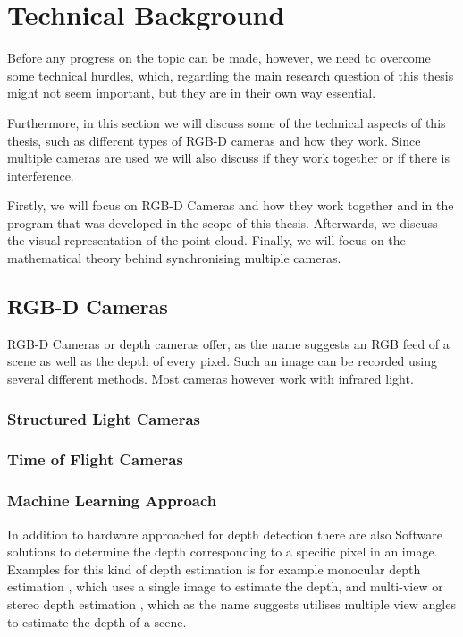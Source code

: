 \section{Technical Background}

Before any progress on the topic can be made, however, we need to overcome some technical hurdles, which, regarding the main research question of this thesis might not seem important, but they are in their own way essential.

Furthermore, in this section we will discuss some of the technical aspects of this thesis, such as different types of RGB-D cameras and how they work. Since multiple cameras are used we will also discuss if they work together or if there is interference.

Firstly, we will focus on RGB-D Cameras and how they work together and in the program that was developed in the scope of this thesis. Afterwards, we discuss the visual representation of the point-cloud. Finally, we will focus on the mathematical theory behind synchronising multiple cameras. 

\subsection{RGB-D Cameras}

RGB-D Cameras or depth cameras offer, as the name suggests an RGB feed of a scene as well as the depth of every pixel. Such an image can be recorded using several different methods. Most cameras however work with infrared light.

\subsubsection{Structured Light Cameras}

\subsubsection{Time of Flight Cameras}

\subsubsection{Machine Learning Approach}

In addition to hardware approached for depth detection there are also Software solutions to determine the depth corresponding to a specific pixel in an image. Examples for this kind of depth estimation is for example monocular depth estimation \cite{mono_depthestimation_bts, mono_depthestimation_depthformer, mono_depthestimation_glpn}, which uses a single image to estimate the depth, and multi-view or stereo depth estimation \cite{multiview_depthestimation_epipolar, multiview_depthestimation_fusion, multiview_depthestimation_RealSense_and_any}, which as the name suggests utilises multiple view angles to estimate the depth of a scene.

